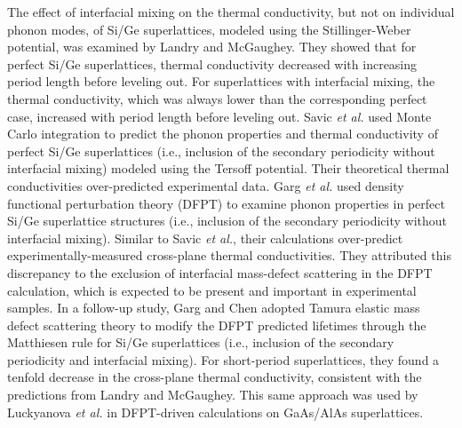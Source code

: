 \documentclass[aps,prb,preprint,preprintnumbers,amsmath,amssymb,floatfix,superscriptaddress]{revtex4}
\begin{document}
The effect of interfacial mixing on the thermal conductivity, but not on individual phonon modes, of Si/Ge superlattices, modeled using the Stillinger-Weber potential, was examined by Landry and McGaughey.\cite{PhysRevB.79.075316} They showed that for perfect Si/Ge superlattices, thermal conductivity decreased with increasing period length before leveling out. For superlattices with interfacial mixing, the thermal conductivity, which was always lower than the corresponding perfect case, increased with period length before leveling out. Savic \textit{et al.} used Monte Carlo integration to predict the phonon properties and thermal conductivity of perfect Si/Ge superlattices (i.e., inclusion of the secondary periodicity without interfacial mixing) modeled using the Tersoff potential. Their theoretical thermal conductivities over-predicted experimental data.\cite{savic:073113} Garg \textit{et al.} used density functional perturbation theory (DFPT) to examine phonon properties in perfect Si/Ge superlattice structures (i.e., inclusion of the secondary periodicity without interfacial mixing).\cite{doi:10.1021/nl202186y} Similar to Savic \textit{et al.}, their calculations over-predict experimentally-measured cross-plane thermal conductivities. They attributed this discrepancy to the exclusion of interfacial mass-defect scattering in the DFPT calculation, which is expected to be present and important in experimental samples. In a follow-up study, Garg and Chen adopted Tamura elastic mass defect scattering theory \cite{tamura_isotope_1983} to modify the DFPT predicted lifetimes through the Matthiesen rule for Si/Ge superlattices (i.e., inclusion of the secondary periodicity and interfacial mixing).\cite{PhysRevB.87.140302} For short-period superlattices, they found a tenfold decrease in the cross-plane thermal conductivity, consistent with the predictions from Landry and McGaughey. This same approach was used by Luckyanova \textit{et al.} \cite{Luckyanova16112012} in DFPT-driven calculations on GaAs/AlAs superlattices.
\end{document}
